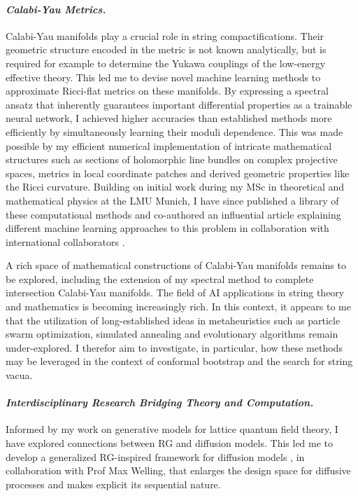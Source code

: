 \documentclass[11pt]{article}
\begin{document}
\paragraph{\textit{{Calabi-Yau Metrics.}}}
Calabi-Yau manifolds play a crucial role in string compactifications.
Their geometric structure encoded in the metric is not known analytically, but is required for example to determine the Yukawa couplings of the low-energy effective theory.
This led me to devise novel machine learning methods to approximate Ricci-flat metrics on these manifolds.
By expressing a spectral ansatz that inherently guarantees important differential properties as a trainable neural network, I achieved higher accuracies than established methods more efficiently by simultaneously learning their moduli dependence.
This was made possible by my efficient numerical implementation of intricate mathematical structures such as sections of holomorphic line bundles on complex projective spaces, metrics in local coordinate patches and derived geometric properties like the Ricci curvature.
Building on initial work during my MSc in theoretical and mathematical physics at the LMU Munich, I have since published a library of these computational methods \cite{gerdes2023CYJAXPackage} and co-authored an influential article explaining different machine learning approaches to this problem in collaboration with international collaborators \cite{anderson2021ModulidependentCalabiYau}.

\textbf{\color{royalblue}{Future Directions.}}
A rich space of mathematical constructions of Calabi-Yau manifolds remains to be explored, including the extension of my spectral method to complete intersection Calabi-Yau manifolds.
The field of AI applications in string theory and mathematics is becoming increasingly rich.
In this context, it appears to me that the utilization of long-established ideas in metaheuristics such as particle swarm optimization, simulated annealing and evolutionary algorithms remain under-explored.
I therefor aim to investigate, in particular, how these methods may be leveraged in the context of conformal bootstrap and the search for string vacua.


\paragraph{\textit{{Interdisciplinary Research Bridging Theory and Computation.}}}
Informed by my work on generative models for lattice quantum field theory, I have explored connections between RG and diffusion models.
This led me to develop a generalized RG-inspired framework for diffusion models \cite{gerdes2024gudgenerationunifieddiffusion}, in collaboration with Prof Max Welling, that enlarges the design space for diffusive processes and makes explicit its sequential nature.
\end{document}
